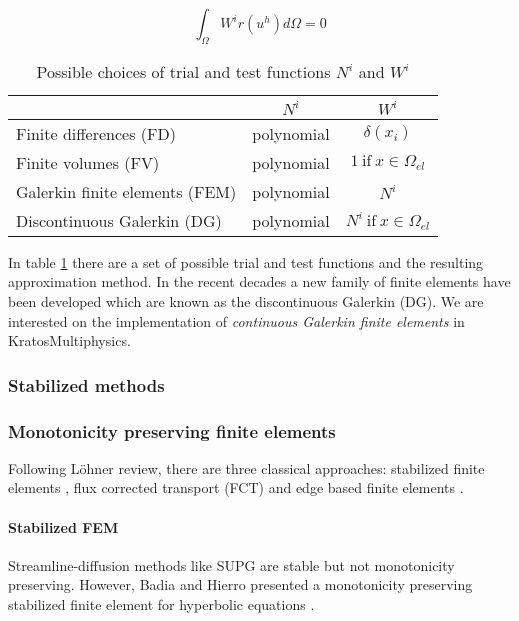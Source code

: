 \begin{equation}
\int_{\Omega} W^ir(u^h)d\Omega = 0
\end{equation}

\begin{table}
\centering
\begin{tabular}{|l|c|c|}
\hline
 & $N^i$ & $W^i$ \\ \hline
Finite differences (FD)         & polynomial & $\delta(x_i)$ \\ \hline
Finite volumes (FV)             & polynomial & $1 \ \text{if} \ x\in\Omega_{el}$ \\ \hline
Galerkin finite elements (FEM)  & polynomial & $N^i$ \\ \hline
Discontinuous Galerkin (DG)     & polynomial & $N^i \ \text{if} \ x\in\Omega_{el}$ \\ \hline
\end{tabular}
\caption{Possible choices of trial and test functions $N^i$ and $W^i$}
\label{possible_trial_functions}
\end{table}

In table \ref{possible_trial_functions} there are a set of possible trial and test functions and the resulting approximation method. In the recent decades a new family of finite elements have been developed which are known as the discontinuous Galerkin (DG). We are interested on the implementation of \emph{continuous Galerkin finite elements} in KratosMultiphysics.


\subsubsection{Stabilized methods}



\subsubsection{Monotonicity preserving finite elements}

Following Löhner review, there are three classical approaches: stabilized finite elements \cite{lohner2008}, flux corrected transport (FCT) \cite{lohner2008ch9} and edge based finite elements \cite{lohner2008ch10}.

\paragraph*{Stabilized FEM} Streamline-diffusion methods like SUPG are stable but not
monotonicity preserving. However, Badia and Hierro presented a monotonicity preserving stabilized finite element for hyperbolic equations \cite{badia2014}.

